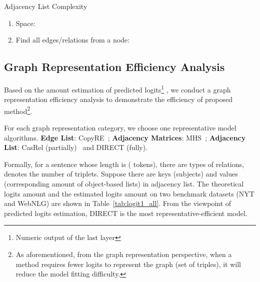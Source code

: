 \documentclass[11pt,a4paper]{article}
\begin{document}
  Adjacency List Complexity
    \begin{enumerate}
    	\item[] Space: 
        \item[] Find all edges/relations from a node: 
    \end{enumerate}

\subsection{Graph Representation Efficiency Analysis}\label{ass:gre}
Based on the amount estimation of predicted logits\footnote{Numeric output of the last layer} , we conduct a graph representation efficiency analysis to demonstrate the efficiency of proposed method\footnote{As aforementioned, from the graph representation perspective, when a method requires fewer logits to represent the graph (set of triples), it will reduce the model fitting difficulty.}.

For each graph representation category, we choose one representative model algorithms. \textbf{Edge List}: CopyRE~\cite{zeng2018extracting}; \textbf{Adjacency Matrices}: MHS~\cite{bekoulis2018joint}; \textbf{Adjacency List}: CasRel (partially)~\cite{wei2020novel} and DIRECT (fully).

Formally, for a sentence whose length is  ( tokens), there are   types of relations,  denotes the number of triplets. Suppose there are  keys (subjects) and  values (corresponding amount of  object-based lists) in adjacency list. The theoretical logits amount and the estimated logits amount on two benchmark datasets (NYT and WebNLG) are shown in Table~\ref{tab:logit1_all}. From the viewpoint of predicted logits estimation, DIRECT is the most representative-efficient model.



 
\end{document}
